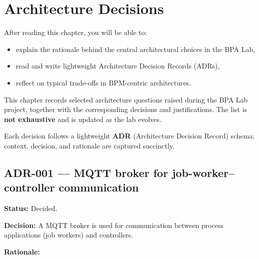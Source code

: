 \documentclass[
  english,
  11pt,
  a4paper,
]{scrbook}
\providecommand{\tightlist}{%
  \setlength{\itemsep}{0pt}\setlength{\parskip}{0pt}}
\begin{document}

\chapter{Architecture Decisions}\label{architecture-decisions}

\begin{tcolorbox}[enhanced jigsaw, arc=.35mm, bottomrule=.15mm, bottomtitle=1mm, breakable, colback=white, colbacktitle=quarto-callout-note-color!10!white, colframe=quarto-callout-note-color-frame, coltitle=black, left=2mm, leftrule=.75mm, opacityback=0, opacitybacktitle=0.6, rightrule=.15mm, title=\textcolor{quarto-callout-note-color}{\faInfo}\hspace{0.5em}{Learning objectives}, titlerule=0mm, toprule=.15mm, toptitle=1mm]

After reading this chapter, you will be able to:

\begin{itemize}
\tightlist
\item
  explain the rationale behind the central architectural choices in the
  BPA Lab,
\item
  read and write lightweight Architecture Decision Records (ADRs),
\item
  reflect on typical trade-offs in BPM-centric architectures.
\end{itemize}

\end{tcolorbox}

This chapter records selected architecture questions raised during the
BPA Lab project, together with the corresponding decisions and
justifications. The list is \textbf{not exhaustive} and is updated as
the lab evolves.

Each decision follows a lightweight \textbf{ADR} (Architecture Decision
Record) schema: context, decision, and rationale are captured
succinctly.

\section{ADR-001 --- MQTT broker for job-worker--controller
communication}\label{adr-001-mqtt-broker-for-job-workercontroller-communication}

\textbf{Status:} Decided.

\textbf{Decision:} A MQTT broker is used for communication between
process applications (job workers) and controllers.

\textbf{Rationale:}
\end{document}

